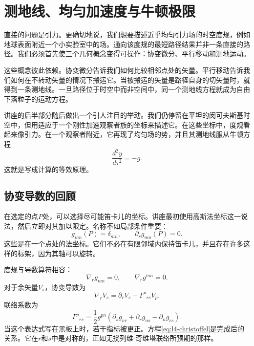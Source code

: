 \chapter{测地线、均匀加速度与牛顿极限}

直接的问题是引力。更确切地说，我们想要描述近乎均匀引力场的时空度规，例如地球表面附近一个小实验室中的场。通向该度规的最短路径结果并非一条直接的路径。我们必须首先使三个几何概念变得可操作：协变微分、平行移动和测地运动。

这些概念彼此依赖。协变微分告诉我们如何比较相邻点处的矢量。平行移动告诉我们如何在不转动矢量的情况下搬运它。当被搬运的矢量是路径自身的切矢量时，就得到一条测地线。一旦路径位于时空中而非空间中，同一个测地线方程就成为自由下落粒子的运动方程。

讲座的后半部分随后做出一个引人注目的举动。我们仍停留在平坦的闵可夫斯基时空中，但用适应于一个刚性加速观察者族的坐标来描述它。在这些坐标中，度规看起来像引力。在一个观察者附近，它再现了均匀场的势，并且其测地线服从牛顿方程
\begin{equation}
\frac{d^2y}{d\tau^2}=-g.
\end{equation}
这就是写成计算的等效原理。

\section{协变导数的回顾}

在选定的点\(P\)处，可以选择尽可能笛卡儿的坐标。讲座最初使用高斯法坐标这一说法，然后立即对其加以限定。名称不如局部条件重要：
\begin{equation}
g_{mn}(P)=\delta_{mn},
\qquad
\partial_r g_{mn}(P)=0.
\label{eq:l4-normal-point}
\end{equation}
这些是在一个点处的法坐标。它们不必在有限邻域内保持笛卡儿，并且存在许多这样的标架，因为其轴可以旋转。

度规与导数算符相容：
\begin{equation}
\nabla_r g_{mn}=0,
\qquad
\nabla_r g^{mn}=0.
\label{eq:l4-metric-compatibility}
\end{equation}
对于余矢量\(V_s\)，协变导数为
\begin{equation}
\nabla_r V_s
=
\partial_r V_s-\Gamma^p{}_{rs}V_p.
\label{eq:l4-covector-derivative}
\end{equation}
联络系数为
\begin{equation}
\Gamma^p{}_{rs}
=
\frac{1}{2}g^{pn}
\left(
\partial_s g_{nr}
+\partial_r g_{ns}
-\partial_n g_{rs}
\right).
\label{eq:l4-christoffel}
\end{equation}
当这个表达式写在黑板上时，若干指标被更正。方程\eqref{eq:l4-christoffel}是完成后的关系。它在\(r\)和\(s\)中是对称的，正如无挠列维-奇维塔联络所预期的那样。

